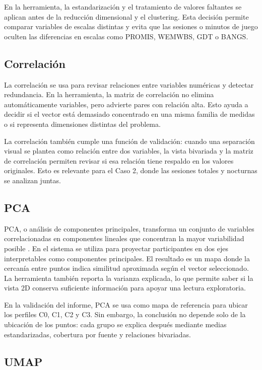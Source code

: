 \documentclass[12pt,a4paper]{article}
\begin{document}
En la herramienta, la estandarizaci\'on y el tratamiento de valores faltantes se aplican antes de la reducci\'on dimensional y el clustering. Esta decisi\'on permite comparar variables de escalas distintas y evita que las sesiones o minutos de juego oculten las diferencias en escalas como PROMIS, WEMWBS, GDT o BANGS.

\subsection{Correlaci\'on}

La correlaci\'on se usa para revisar relaciones entre variables num\'ericas y detectar redundancia. En la herramienta, la matriz de correlaci\'on no elimina autom\'aticamente variables, pero advierte pares con relaci\'on alta. Esto ayuda a decidir si el vector est\'a demasiado concentrado en una misma familia de medidas o si representa dimensiones distintas del problema.

La correlaci\'on tambi\'en cumple una funci\'on de validaci\'on: cuando una separaci\'on visual se plantea como relaci\'on entre dos variables, la vista bivariada y la matriz de correlaci\'on permiten revisar si esa relaci\'on tiene respaldo en los valores originales. Esto es relevante para el Caso 2, donde las sesiones totales y nocturnas se analizan juntas.

\subsection{PCA}

PCA, o an\'alisis de componentes principales, transforma un conjunto de variables correlacionadas en componentes lineales que concentran la mayor variabilidad posible \cite{jolliffe}. En el sistema se utiliza para proyectar participantes en dos ejes interpretables como componentes principales. El resultado es un mapa donde la cercan\'ia entre puntos indica similitud aproximada seg\'un el vector seleccionado. La herramienta tambi\'en reporta la varianza explicada, lo que permite saber si la vista 2D conserva suficiente informaci\'on para apoyar una lectura exploratoria.

En la validaci\'on del informe, PCA se usa como mapa de referencia para ubicar los perfiles C0, C1, C2 y C3. Sin embargo, la conclusi\'on no depende solo de la ubicaci\'on de los puntos: cada grupo se explica despu\'es mediante medias estandarizadas, cobertura por fuente y relaciones bivariadas.

\subsection{UMAP}
\end{document}
